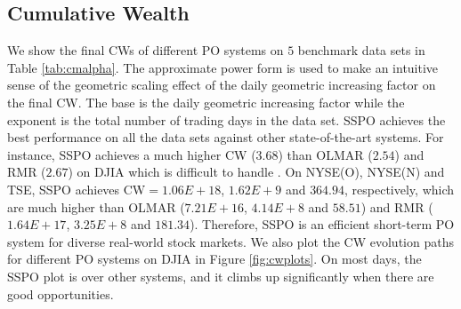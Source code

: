 \documentclass[twoside,11pt]{article}
\begin{document}
\subsection{Cumulative Wealth}
\label{sec:cumwealth}
We show the final CWs of different PO systems on $5$ benchmark data sets in Table \ref{tab:cmalpha}. The approximate power form is used to make an intuitive sense of the geometric scaling effect of the daily geometric increasing factor on the final CW. The base is the daily geometric increasing factor while the exponent is the total number of trading days in the data set. SSPO achieves the best performance on all the data sets against other state-of-the-art systems. For instance, SSPO achieves a much higher CW ($3.68$) than OLMAR ($2.54$) and RMR ($2.67$) on DJIA which is difficult to handle \citep{RMR2}. On NYSE(O), NYSE(N) and TSE, SSPO achieves CW$=1.06E{+}18$, $1.62E{+}9$ and $364.94$, respectively, which are much higher than OLMAR ($7.21E{+}16$, $4.14E{+}8$ and $58.51$) and RMR ($1.64E{+}17$, $3.25E{+}8$ and $181.34$). Therefore, SSPO is an efficient short-term PO system for diverse real-world stock markets. We also plot the CW evolution paths for different PO systems on DJIA in Figure \ref{fig:cwplots}. On most days, the SSPO plot is over other systems, and it climbs up significantly when there are good opportunities.
\end{document}
